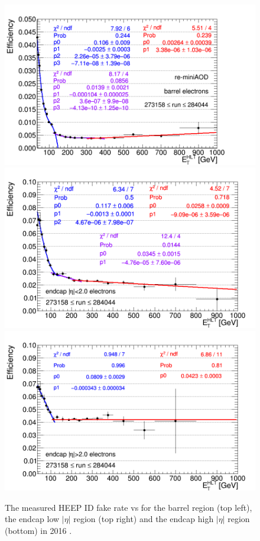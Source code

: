 \begin{figure}[b]
  \begin{center}
\includegraphics[width=0.47\linewidth,angle=0]{figures/Zprime/2016/fakeRates/frEBGSFixed.png}
\includegraphics[width=0.47\linewidth,angle=0]{figures/Zprime/2016/fakeRates/frEELowVsEt.png}
\includegraphics[width=0.47\linewidth,angle=0]{figures/Zprime/2016/fakeRates/frEEHighVsEt.png}
    \caption{The measured HEEP ID fake rate vs \et for the barrel region (top left), the endcap low $|\eta|$ region (top right) and the endcap high $|\eta|$ region (bottom) in 2016 \cite{CMS-AN-2016-404}.}
       \label{fr:fig:heepFRV70VsEt_2016}
  \end{center}
\end{figure}

